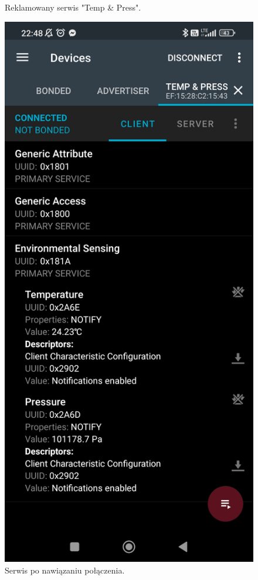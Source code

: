 \documentclass[11pt]{article} %
\begin{document}
\begin{figure}[H]
\begin{minipage}[H]{0.4\textwidth}
\captionsetup{justification=centering}
\caption{Reklamowany serwis "Temp \& Press".}
\end{minipage}
\begin{minipage}[H]{0.4\textwidth}
\centering
\includegraphics[scale=0.1]{nRFconnect_2}
\captionsetup{justification=centering}
\caption{Serwis po nawiązaniu połączenia.}
\end{minipage}
\end{figure}
\end{document}
